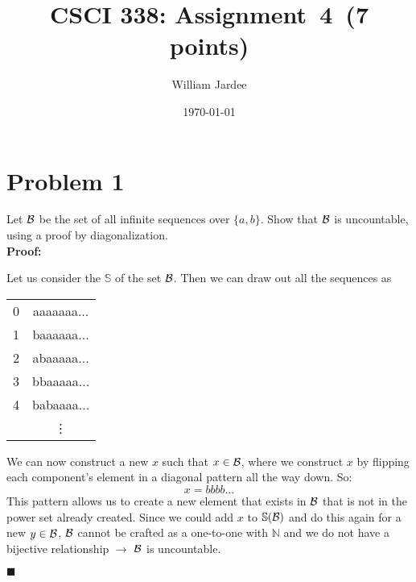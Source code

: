 \documentclass[11pt]{article}
\begin{document}
\graphicspath{{../images/}}

\title{CSCI 338: Assignment~4~(7 points)}
\author{William Jardee}
\date{\today}
\maketitle






\section*{Problem 1}

    Let ${\cal B}$ be the set of all infinite sequences over $\{a,b\}$. Show that
    ${\cal B}$ is uncountable, using a proof by diagonalization.\\
    
    \textbf{Proof:}

    \noindent
    Let us consider the $\mathbb{S}$ of the set ${\cal B}$. Then we can draw out all the sequences as 
    \begin{center}
        \begin{tabular}{c|c}
            0 &  aaaaaaa...\\
            1 &  baaaaaa...\\
            2 &  abaaaaa...\\
            3 &  bbaaaaa...\\
            4 &  babaaaa...\\
              &  \vdots \\
        \end{tabular}
    \end{center}
    We can now construct a new $x$ such that $x \in {\cal B}$, where we construct $x$ by flipping each component's element in a diagonal pattern all the way down. So: 
    \[x = bbbb...\]
    This pattern allows us to create a new element that exists in ${\cal B}$ that is not in the power set already created. Since we could add $x$ to $\mathbb{S}({\cal B})$ and do this again for a new $y \in {\cal B}$, ${\cal B}$ cannot be crafted as a one-to-one with $\mathbb{N}$ and we do not have a bijective relationship $\rightarrow$ ${\cal B}$ is uncountable. 
    
    \begin{flushright}$\blacksquare$\end{flushright}
\newpage
\end{document}

